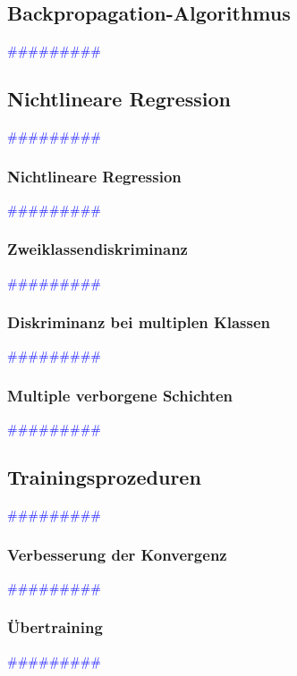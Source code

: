 \documentclass{article}
\begin{document}
  \subsection{Backpropagation-Algorithmus} %
      \textcolor{blue}{\#\#\#\#\#\#\#\#\#}
  \subsection{Nichtlineare Regression} %
      \textcolor{blue}{\#\#\#\#\#\#\#\#\#}
    \subsubsection{Nichtlineare Regression} %
      \textcolor{blue}{\#\#\#\#\#\#\#\#\#}
    \subsubsection{Zweiklassendiskriminanz} %
      \textcolor{blue}{\#\#\#\#\#\#\#\#\#}
    \subsubsection{Diskriminanz bei multiplen Klassen} %
      \textcolor{blue}{\#\#\#\#\#\#\#\#\#}
    \subsubsection{Multiple verborgene Schichten} %
      \textcolor{blue}{\#\#\#\#\#\#\#\#\#}
  \subsection{Trainingsprozeduren} %
      \textcolor{blue}{\#\#\#\#\#\#\#\#\#}
    \subsubsection{Verbesserung der Konvergenz} %
      \textcolor{blue}{\#\#\#\#\#\#\#\#\#}
    \subsubsection{Übertraining} %
      \textcolor{blue}{\#\#\#\#\#\#\#\#\#}
\end{document}
